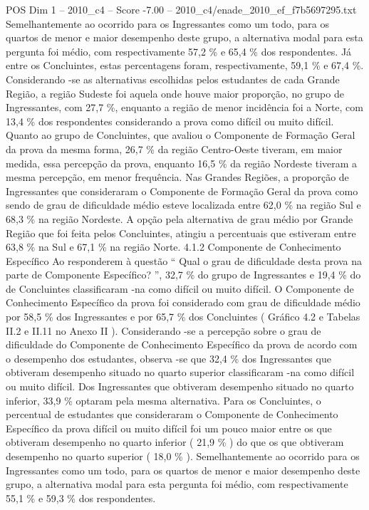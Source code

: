 \begin{textsample}{POS Dim 1 – 2010\_c4 – Score -7.00 – 2010\_c4/enade\_2010\_ef\_f7b5697295.txt}
Semelhantemente ao ocorrido para os Ingressantes como um todo, para os quartos de menor e maior desempenho deste grupo, a alternativa modal para esta pergunta foi médio, com respectivamente 57,2 \% e 65,4 \% dos respondentes.
Já entre os Concluintes, estas percentagens foram, respectivamente, 59,1 \% e 67,4 \%.
Considerando -se as alternativas escolhidas pelos estudantes de cada Grande Região, a região Sudeste foi aquela onde houve maior proporção, no grupo de Ingressantes, com 27,7 \%, enquanto a região de menor incidência foi a Norte, com 13,4 \% dos respondentes considerando a prova como difícil ou muito difícil.
Quanto ao grupo de Concluintes, que avaliou o Componente de Formação Geral da prova da mesma forma, 26,7 \% da região Centro-Oeste tiveram, em maior medida, essa percepção da prova, enquanto 16,5 \% da região Nordeste tiveram a mesma percepção, em menor frequência.
Nas Grandes Regiões, a proporção de Ingressantes que consideraram o Componente de Formação Geral da prova como sendo de grau de dificuldade médio esteve localizada entre 62,0 \% na região Sul e 68,3 \% na região Nordeste.
A opção pela alternativa de grau médio por Grande Região que foi feita pelos Concluintes, atingiu a percentuais que estiveram entre 63,8 \% na Sul e 67,1 \% na região Norte. 4.1.2 Componente de Conhecimento Específico Ao responderem à questão “ Qual o grau de dificuldade desta prova na parte de Componente Específico? ”, 32,7 \% do grupo de Ingressantes e 19,4 \% do de Concluintes classificaram -na como difícil ou muito difícil.
O Componente de Conhecimento Específico da prova foi considerado com grau de dificuldade médio por 58,5 \% dos Ingressantes e por 65,7 \% dos Concluintes ( Gráfico 4.2 e Tabelas II.2 e II.11 no Anexo II ).
Considerando -se a percepção sobre o grau de dificuldade do Componente de Conhecimento Específico da prova de acordo com o desempenho dos estudantes, observa -se que 32,4 \% dos Ingressantes que obtiveram desempenho situado no quarto superior classificaram -na como difícil ou muito difícil.
Dos Ingressantes que obtiveram desempenho situado no quarto inferior, 33,9 \% optaram pela mesma alternativa.
Para os Concluintes, o percentual de estudantes que consideraram o Componente de Conhecimento Específico da prova difícil ou muito difícil foi um pouco maior entre os que obtiveram desempenho no quarto inferior ( 21,9 \% ) do que os que obtiveram desempenho no quarto superior ( 18,0 \% ).
Semelhantemente ao ocorrido para os Ingressantes como um todo, para os quartos de menor e maior desempenho deste grupo, a alternativa modal para esta pergunta foi médio, com respectivamente 55,1 \% e 59,3 \% dos respondentes.

\end{textsample}
